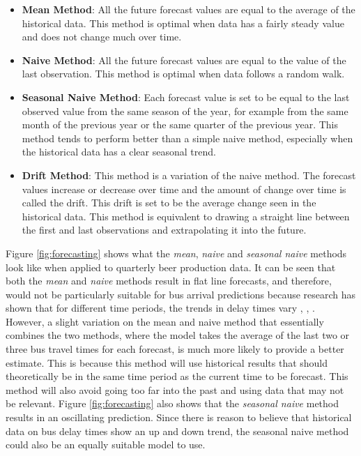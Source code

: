 \begin{itemize}
    \item \textbf{Mean Method}: All the future forecast values are equal to the average of the historical data. This method is optimal when data has a fairly steady value and does not change much over time.
    \item \textbf{Naive Method}: All the future forecast values are equal to the value of the last observation. This method is optimal when data follows a random walk.
    \item \textbf{Seasonal Naive Method}: Each forecast value is set to be equal to the last observed value from the same season of the year, for example from the same month of the previous year or the same quarter of the previous year. This method tends to perform better than a simple naive method, especially when the historical data has a clear seasonal trend. 
    \item \textbf{Drift Method}: This method is a variation of the naive method. The forecast values increase or decrease over time and the amount of change over time is called the drift. This drift is set to be the average change seen in the historical data. This method is equivalent to drawing a straight line between the first and last observations and extrapolating it into the future. 
\end{itemize}

Figure \ref{fig:forecasting} shows what the \textit{mean}, \textit{naive} and \textit{seasonal naive} methods look like when applied to quarterly beer production data. It can be seen that both the \textit{mean} and \textit{naive} methods result in flat line forecasts, and therefore, would not be particularly suitable for bus arrival predictions because research has shown that for different time periods, the trends in delay times vary \cite{dynamic-gps}, \cite{ann-prediction}, \cite{smart-public-transport}. However, a slight variation on the mean and naive method that essentially combines the two methods, where the model takes the average of the last two or three bus travel times for each forecast, is much more likely to provide a better estimate. This is because this method will use historical results that should theoretically be in the same time period as the current time to be forecast. This method will also avoid going too far into the past and using data that may not be relevant. Figure \ref{fig:forecasting} also shows that the \textit{seasonal naive} method results in an oscillating prediction. Since there is reason to believe that historical data on bus delay times show an up and down trend, the seasonal naive method could also be an equally suitable model to use.

